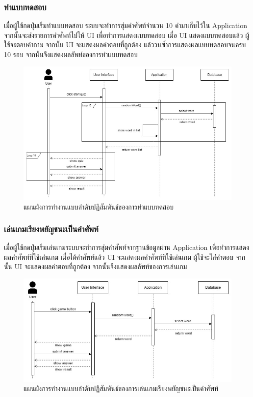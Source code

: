 \documentclass[12pt,oneside,openright,a4paper]{cpe-thai-project}
\begin{document}
\subsubsection{ทำแบบทดสอบ}
\hspace{1cm}
เมื่อผู้ใช้กดปุ่มเริ่มทำแบบทดสอบ ระบบจะทำการสุ่มคำศัพท์จำนวน 10 คำมาเก็บไว้ใน Application จากนั้นจะส่งรายการคำศัพท์ไปให้ UI เพื่อทำการแสดงแบบทดสอบ
เมื่อ UI แสดงแบบทดสอบแล้ว ผู้ใช้จะตอบคำถาม จากนั้น UI จะแสดงผลคำตอบที่ถูกต้อง แล้ววนซ้ำการแสดงผลแบบทดสอบจนครบ 10 รอบ จากนั้นจึงแสดงผลลัพท์ของการทำแบบทดสอบ
\begin{figure}[!h]\centering
	\includegraphics[width=\textwidth, keepaspectratio=true]{image/chap3/sequence/Quiz.jpg}
	\caption{แผนผังการทำงานแบบลำดับปฏิสัมพันธ์ของการทำแบบทดสอบ}\label{fig:S_Quiz}
\end{figure}

\pagebreak
\subsubsection{เล่นเกมเรียงพยัญชนะเป็นคำศัพท์}
\hspace{1cm}
เมื่อผู้ใช้กดปุ่มเริ่มเล่นเกมระบบจะทำการสุ่มคำศัพท์จากฐานข้อมูลผ่าน Application เพื่อทำการแสดงผลคำศัพท์ที่ใช้เล่นเกม เมื่อได้คำศัพท์แล้ว
UI จะแสดงผลคำศัพท์ที่ใช้เล่นเกม ผู้ใช้จะใส่คำตอบ จากนั้น UI จะแสดงผลคำตอบที่ถูกต้อง จากนั้นจึงแสดงผลลัพท์ของการเล่นเกม
\begin{figure}[!h]\centering
	\includegraphics[width=\textwidth, keepaspectratio=true]{image/chap3/sequence/Game.jpg}
	\caption{แผนผังการทำงานแบบลำดับปฏิสัมพันธ์ของการเล่นเกมเรียงพยัญชนะเป็นคำศัพท์}\label{fig:S_Game}
\end{figure}
\end{document}
